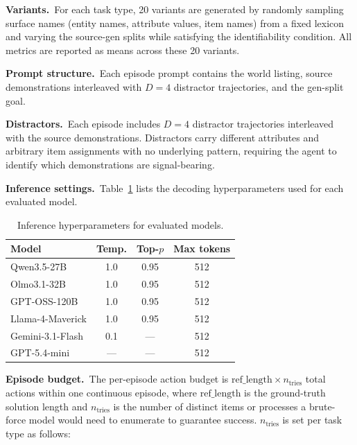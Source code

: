 \documentclass[11pt]{article}
\begin{document}
\noindent\textbf{Variants.}~For each task type, 20 variants are generated by randomly sampling surface names (entity names, attribute values, item names) from a fixed lexicon and varying the source-gen splits while satisfying the identifiability condition. All metrics are reported as means across these 20 variants.

\noindent\textbf{Prompt structure.}~Each episode prompt contains the world listing, source demonstrations interleaved with $D{=}4$ distractor trajectories, and the gen-split goal.

\noindent\textbf{Distractors.}~Each episode includes $D{=}4$ distractor trajectories interleaved with the source demonstrations. Distractors carry different attributes and arbitrary item assignments with no underlying pattern, requiring the agent to identify which demonstrations are signal-bearing.

\noindent\textbf{Inference settings.}~Table~\ref{tab:inference} lists the decoding hyperparameters used for each evaluated model.

\begin{table}[h]
\centering
\small
\begin{tabular}{lccc}
\toprule
Model & Temp. & Top-$p$ & Max tokens \\
\midrule
Qwen3.5-27B      & 1.0 & 0.95 & 512 \\
Olmo3.1-32B      & 1.0 & 0.95 & 512 \\
GPT-OSS-120B     & 1.0 & 0.95 & 512 \\
Llama-4-Maverick & 1.0 & 0.95 & 512 \\
Gemini-3.1-Flash & 0.1 & —    & 512 \\
GPT-5.4-mini     & —   & —    & 512 \\
\bottomrule
\end{tabular}
\caption{Inference hyperparameters for evaluated models.}
\label{tab:inference}
\end{table}

\noindent\textbf{Episode budget.}~The per-episode action budget is $\text{ref\_length} \times n_\text{tries}$ total actions within one continuous episode, where $\text{ref\_length}$ is the ground-truth solution length and $n_\text{tries}$ is the number of distinct items or processes a brute-force model would need to enumerate to guarantee success. $n_\text{tries}$ is set per task type as follows:
\end{document}
